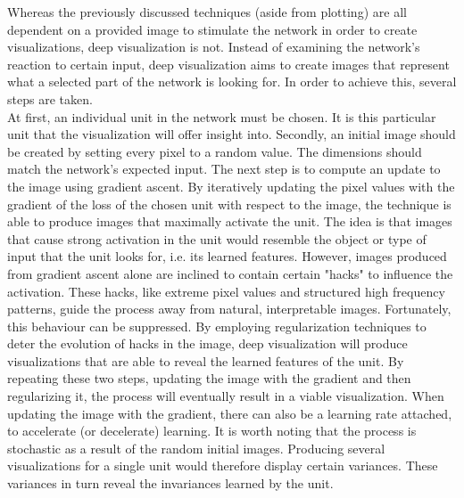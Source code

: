 Whereas the previously discussed techniques (aside from plotting) are all dependent on a provided image to stimulate the network in order to create visualizations, deep visualization is not. Instead of examining the network's reaction to certain input, deep visualization aims to create images that represent what a selected part of the network is looking for. In order to achieve this, several steps are taken. \\

\noindent At first, an individual unit in the network must be chosen. It is this particular unit that the visualization will offer insight into. Secondly, an initial image should be created by setting every pixel to a random value. The dimensions should match the network's expected input. The next step is to compute an update to the image using gradient ascent. By iteratively updating the pixel values with the gradient of the loss of the chosen unit with respect to the image, the technique is able to produce images that maximally activate the unit. The idea is that images that cause strong activation in the unit would resemble the object or type of input that the unit looks for, i.e. its learned features. However, images produced from gradient ascent alone are inclined to contain certain "hacks" to influence the activation. These hacks, like extreme pixel values and structured high frequency patterns, guide the process away from natural, interpretable images. Fortunately, this behaviour can be suppressed. By employing regularization techniques to deter the evolution of hacks in the image, deep visualization will produce visualizations that are able to reveal the learned features of the unit. By repeating these two steps, updating the image with the gradient and then regularizing it, the process will eventually result in a viable visualization. When updating the image with the gradient, there can also be a learning rate attached, to accelerate (or decelerate) learning. It is worth noting that the process is stochastic as a result of the random initial images. Producing several visualizations for a single unit would therefore display certain variances. These variances in turn reveal the invariances learned by the unit. \\

